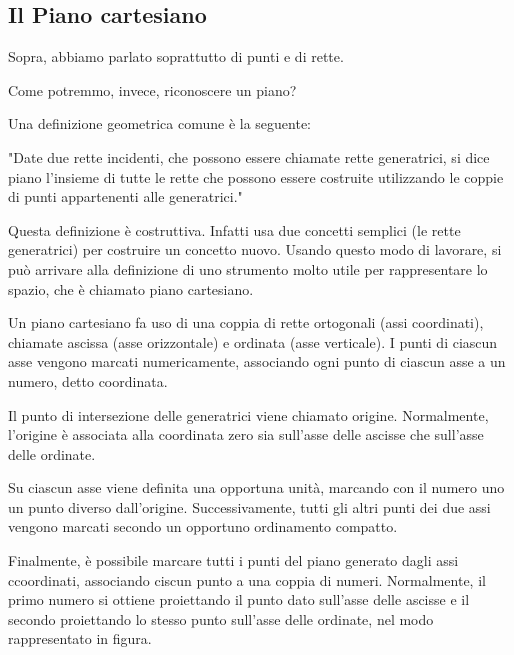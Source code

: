 \subsection*{Il Piano cartesiano}

Sopra, abbiamo parlato soprattutto di punti e di rette.
\newline

Come potremmo, invece, riconoscere un piano?
\newline

Una definizione geometrica comune è la seguente:

"Date due rette incidenti, che possono essere chiamate rette generatrici, si dice piano l'insieme di tutte le rette che
possono essere costruite utilizzando le coppie di punti appartenenti alle generatrici."
\newline

Questa definizione è costruttiva. Infatti usa due concetti semplici (le rette generatrici) per costruire un concetto
nuovo. Usando questo modo di lavorare, si può arrivare alla definizione di uno strumento molto utile per rappresentare
lo spazio, che è chiamato piano cartesiano.
\newline

Un piano cartesiano fa uso di una coppia di rette ortogonali (assi coordinati), chiamate ascissa (asse orizzontale) e
ordinata (asse verticale). I punti di ciascun asse vengono marcati numericamente, associando ogni punto di ciascun asse
a un numero,
detto coordinata.
\newline

Il punto di intersezione delle generatrici viene chiamato origine. Normalmente, l'origine è associata alla
coordinata zero sia sull'asse delle ascisse che sull'asse delle ordinate.
\newline

Su ciascun asse viene definita una opportuna unità, marcando con il numero uno un punto diverso dall'origine.\newline
Successivamente, tutti gli altri punti dei due assi vengono marcati secondo un opportuno ordinamento compatto.
\newline

Finalmente, è possibile marcare tutti i punti del piano generato dagli assi ccoordinati, associando ciscun punto a una
coppia di numeri. Normalmente, il primo numero si ottiene proiettando il punto dato sull'asse delle ascisse e il
secondo proiettando lo stesso punto sull'asse delle ordinate, nel modo rappresentato in figura.
\newline
